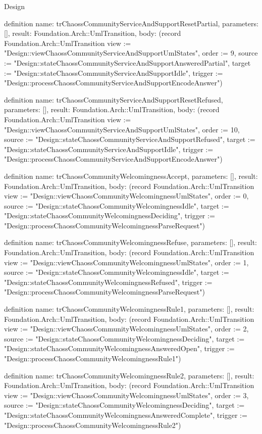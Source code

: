 \begin{lexlean}{Design}
\begin{semanticmodule}
definition{
  name: trChaossCommunityServiceAndSupportResetPartial,
  parameters: [],
  result: Foundation.Arch::UmlTransition,
  body: (record Foundation.Arch::UmlTransition {view := "Design::viewChaossCommunityServiceAndSupportUmlStates", order := 9, source := "Design::stateChaossCommunityServiceAndSupportAnsweredPartial", target := "Design::stateChaossCommunityServiceAndSupportIdle", trigger := "Design::processChaossCommunityServiceAndSupportEncodeAnswer"})
}

definition{
  name: trChaossCommunityServiceAndSupportResetRefused,
  parameters: [],
  result: Foundation.Arch::UmlTransition,
  body: (record Foundation.Arch::UmlTransition {view := "Design::viewChaossCommunityServiceAndSupportUmlStates", order := 10, source := "Design::stateChaossCommunityServiceAndSupportRefused", target := "Design::stateChaossCommunityServiceAndSupportIdle", trigger := "Design::processChaossCommunityServiceAndSupportEncodeAnswer"})
}

definition{
  name: trChaossCommunityWelcomingnessAccept,
  parameters: [],
  result: Foundation.Arch::UmlTransition,
  body: (record Foundation.Arch::UmlTransition {view := "Design::viewChaossCommunityWelcomingnessUmlStates", order := 0, source := "Design::stateChaossCommunityWelcomingnessIdle", target := "Design::stateChaossCommunityWelcomingnessDeciding", trigger := "Design::processChaossCommunityWelcomingnessParseRequest"})
}

definition{
  name: trChaossCommunityWelcomingnessRefuse,
  parameters: [],
  result: Foundation.Arch::UmlTransition,
  body: (record Foundation.Arch::UmlTransition {view := "Design::viewChaossCommunityWelcomingnessUmlStates", order := 1, source := "Design::stateChaossCommunityWelcomingnessIdle", target := "Design::stateChaossCommunityWelcomingnessRefused", trigger := "Design::processChaossCommunityWelcomingnessParseRequest"})
}

definition{
  name: trChaossCommunityWelcomingnessRule1,
  parameters: [],
  result: Foundation.Arch::UmlTransition,
  body: (record Foundation.Arch::UmlTransition {view := "Design::viewChaossCommunityWelcomingnessUmlStates", order := 2, source := "Design::stateChaossCommunityWelcomingnessDeciding", target := "Design::stateChaossCommunityWelcomingnessAnsweredOpen", trigger := "Design::processChaossCommunityWelcomingnessRule1"})
}

definition{
  name: trChaossCommunityWelcomingnessRule2,
  parameters: [],
  result: Foundation.Arch::UmlTransition,
  body: (record Foundation.Arch::UmlTransition {view := "Design::viewChaossCommunityWelcomingnessUmlStates", order := 3, source := "Design::stateChaossCommunityWelcomingnessDeciding", target := "Design::stateChaossCommunityWelcomingnessAnsweredComplete", trigger := "Design::processChaossCommunityWelcomingnessRule2"})
}


\end{semanticmodule}
\end{lexlean}
